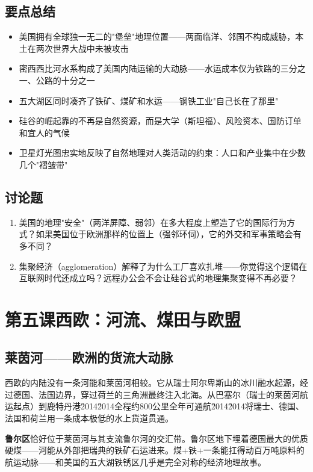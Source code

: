 \documentclass[a4paper,12pt]{ctexart}
\begin{document}
\subsection*{要点总结}
\begin{itemize}
  \item 美国拥有全球独一无二的"堡垒"地理位置——两面临洋、邻国不构成威胁，本土在两次世界大战中未被攻击
  \item 密西西比河水系构成了美国内陆运输的大动脉——水运成本仅为铁路的三分之一、公路的十分之一
  \item 五大湖区同时凑齐了铁矿、煤矿和水运——钢铁工业"自己长在了那里"
  \item 硅谷的崛起靠的不再是自然资源，而是大学（斯坦福）、风险资本、国防订单和宜人的气候
  \item 卫星灯光图忠实地反映了自然地理对人类活动的约束：人口和产业集中在少数几个"褶皱带"
\end{itemize}

\subsection*{讨论题}
\begin{enumerate}
  \item 美国的地理"安全"（两洋屏障、弱邻）在多大程度上塑造了它的国际行为方式？如果美国位于欧洲那样的位置上（强邻环伺），它的外交和军事策略会有多不同？
  \item 集聚经济（agglomeration）解释了为什么工厂喜欢扎堆——你觉得这个逻辑在互联网时代还成立吗？远程办公会不会让硅谷式的地理集聚变得不再必要？
\end{enumerate}



\newpage

\section{\textcolor{orange!80!black}{第五课\quad 西欧：河流、煤田与欧盟}}

\subsection*{莱茵河——欧洲的货流大动脉}

西欧的内陆没有一条河能和莱茵河相较。它从瑞士阿尔卑斯山的冰川融水起源，经过德国、法国边界，穿过荷兰的三角洲最终注入北海。从巴塞尔（瑞士的莱茵河航运起点）到鹿特丹港\u2014\u2014全程约800公里全年可通航\u2014\u2014将瑞士、德国、法国和荷兰用一条成本极低的水上货道贯通。

\textbf{鲁尔区}恰好位于莱茵河与其支流鲁尔河的交汇带。鲁尔区地下埋着德国最大的优质硬煤——河能从外部把瑞典的铁矿石运进来。煤+铁+一条能扛得动百万吨原料的航运动脉——和美国的五大湖铁锈区几乎是完全对称的经济地理故事。
\end{document}
